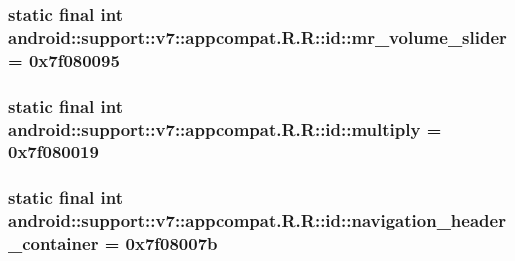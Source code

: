\hypertarget{classandroid_1_1support_1_1v7_1_1appcompat_1_1_r_1_1id_baab24baff8d8493bdc6b3ab5f5fff4d}{
\subsubsection[{mr\_\-volume\_\-slider}]{\setlength{\rightskip}{0pt plus 5cm}static final int android::support::v7::appcompat.R.R::id::mr\_\-volume\_\-slider = 0x7f080095}}
\label{classandroid_1_1support_1_1v7_1_1appcompat_1_1_r_1_1id_baab24baff8d8493bdc6b3ab5f5fff4d}


\hypertarget{classandroid_1_1support_1_1v7_1_1appcompat_1_1_r_1_1id_2acb604a2c4d688480d41211a45e3cb5}{
\subsubsection[{multiply}]{\setlength{\rightskip}{0pt plus 5cm}static final int android::support::v7::appcompat.R.R::id::multiply = 0x7f080019}}
\label{classandroid_1_1support_1_1v7_1_1appcompat_1_1_r_1_1id_2acb604a2c4d688480d41211a45e3cb5}


\hypertarget{classandroid_1_1support_1_1v7_1_1appcompat_1_1_r_1_1id_e5a23b1bd8375a1daa111c49e9cb6886}{
\subsubsection[{navigation\_\-header\_\-container}]{\setlength{\rightskip}{0pt plus 5cm}static final int android::support::v7::appcompat.R.R::id::navigation\_\-header\_\-container = 0x7f08007b}}
\label{classandroid_1_1support_1_1v7_1_1appcompat_1_1_r_1_1id_e5a23b1bd8375a1daa111c49e9cb6886}


